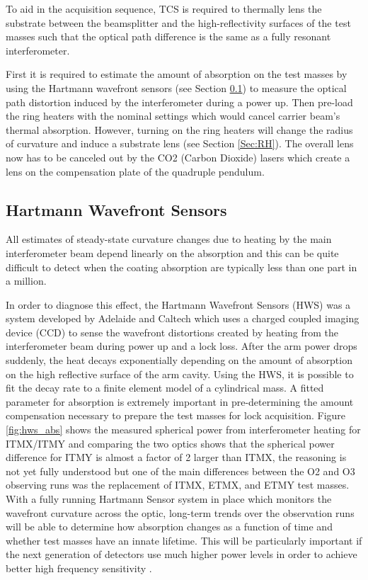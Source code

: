 	To aid in the acquisition sequence, TCS is required to thermally lens the substrate between the beamsplitter and the high-reflectivity surfaces of the test masses such that the optical path difference is the same as a fully resonant interferometer.
	
	First it is required to estimate the amount of absorption on the test masses by using the Hartmann wavefront sensors (see Section \ref{Sec:HWS}) to measure the optical path distortion induced by the interferometer during a power up.  Then pre-load the ring heaters with the nominal settings which would cancel carrier beam's thermal absorption.  However, turning on the ring heaters will change the radius of curvature and induce a substrate lens (see Section \ref{Sec:RH}).  The overall lens now has to be canceled out by the CO2 (Carbon Dioxide) lasers which create a lens on the compensation plate of the quadruple pendulum.

	\subsection{Hartmann Wavefront Sensors}\label{Sec:HWS}
	All estimates of steady-state curvature changes due to heating by the main interferometer beam depend linearly on the absorption and this can be quite difficult to detect when the coating absorption are typically less than one part in a million.
	
	In order to diagnose this effect, the Hartmann Wavefront Sensors (HWS) \cite{Brooks_OffAxis} \cite{Veitch_HWS_ALIGO} was a system developed by Adelaide and Caltech \cite{Brooks_HWS_2007} \cite{Brooks_HWS_2009} which uses a charged coupled imaging device (CCD) to sense the wavefront distortions created by heating from the interferometer beam during power up and a lock loss.  After the arm power drops suddenly, the heat decays exponentially depending on the amount of absorption on the high reflective surface of the arm cavity.  Using the HWS, it is possible to fit the decay rate to a finite element model of a cylindrical mass.  A fitted parameter for absorption is extremely important in pre-determining the amount compensation necessary to prepare the test masses for lock acquisition.  Figure \ref{fig:hws_abs} shows the measured spherical power from interferometer heating for ITMX/ITMY and comparing the two optics shows that the spherical power difference for ITMY is almost a factor of 2 larger than ITMX, the reasoning is not yet fully understood but one of the main differences between the O2 and O3 observing runs was the replacement of ITMX, ETMX, and ETMY test masses.  With a fully running Hartmann Sensor system in place which monitors the wavefront curvature across the optic, long-term trends over the observation runs will be able to determine how absorption changes as a function of time and whether test masses have an innate lifetime.  This will be particularly important if the next generation of detectors use much higher power levels in order to achieve better high frequency sensitivity \cite{DanBrown_prvt}.
	
